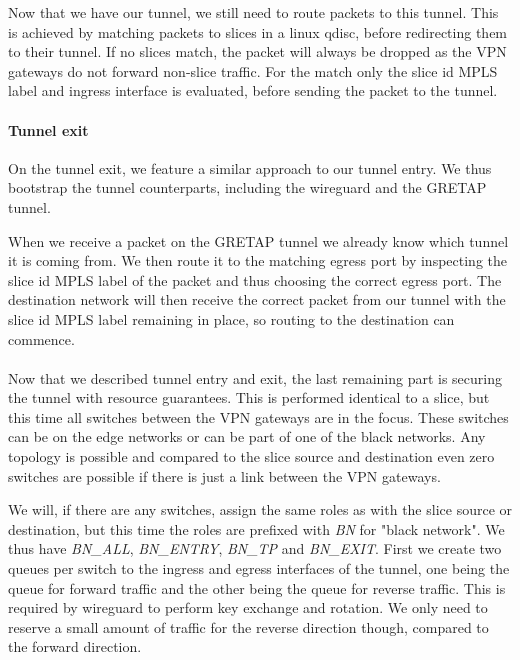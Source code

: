 Now that we have our tunnel, we still need to route packets to this tunnel. This is achieved by matching packets to slices in a linux qdisc, before redirecting them to their tunnel. If no slices match, the packet will always be dropped as the VPN gateways do not forward non-slice traffic. For the match only the slice id MPLS label and ingress interface is evaluated, before sending the packet to the tunnel.

\paragraph{Tunnel exit} On the tunnel exit, we feature a similar approach to our tunnel entry. We thus bootstrap the tunnel counterparts, including the wireguard and the GRETAP tunnel.

When we receive a packet on the GRETAP tunnel we already know which tunnel it is coming from. We then route it to the matching egress port by inspecting the slice id MPLS label of the packet and thus choosing the correct egress port. The destination network will then receive the correct packet from our tunnel with the slice id MPLS label remaining in place, so routing to the destination can commence.

\paragraph{} Now that we described tunnel entry and exit, the last remaining part is securing the tunnel with resource guarantees. This is performed identical to a slice, but this time all switches between the VPN gateways are in the focus. These switches can be on the edge networks or can be part of one of the black networks. Any topology is possible and compared to the slice source and destination even zero switches are possible if there is just a link between the VPN gateways.

We will, if there are any switches, assign the same roles as with the slice source or destination, but this time the roles are prefixed with \textit{BN} for "black network". We thus have \textit{BN\_ALL}, \textit{BN\_ENTRY}, \textit{BN\_TP} and \textit{BN\_EXIT}. First we create two queues per switch to the ingress and egress interfaces of the tunnel, one being the queue for forward traffic and the other being the queue for reverse traffic. This is required by wireguard to perform key exchange and rotation. We only need to reserve a small amount of traffic for the reverse direction though, compared to the forward direction.

